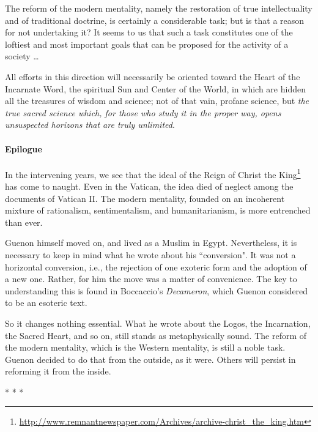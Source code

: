 \begin{quotex}
The reform of the modern mentality, namely the restoration of true intellectuality and of traditional doctrine, is certainly a considerable task; but is that a reason for not undertaking it? It seems to us that such a task constitutes one of the loftiest and most important goals that can be proposed for the activity of a society …

All efforts in this direction will necessarily be oriented toward the Heart of the Incarnate Word, the spiritual Sun and Center of the World, in which are hidden all the treasures of wisdom and science; not of that vain, profane science, but \emph{the true sacred science which, for those who study it in the proper way, opens unsuspected horizons that are truly unlimited}. 

\end{quotex}
\paragraph{Epilogue}
In the intervening years, we see that the ideal of the Reign of Christ the King\footnote{\url{http://www.remnantnewspaper.com/Archives/archive-christ_the_king.htm}} has come to naught. Even in the Vatican, the idea died of neglect among the documents of Vatican II. The modern mentality, founded on an incoherent mixture of rationalism, sentimentalism, and humanitarianism, is more entrenched than ever.

Guenon himself moved on, and lived as a Muslim in Egypt. Nevertheless, it is necessary to keep in mind what he wrote about his ``conversion". It was not a horizontal conversion, i.e., the rejection of one exoteric form and the adoption of a new one. Rather, for him the move was a matter of convenience. The key to understanding this is found in Boccaccio's \emph{Decameron}, which Guenon considered to be an esoteric text.

So it changes nothing essential. What he wrote about the Logos, the Incarnation, the Sacred Heart, and so on, still stands as metaphysically sound. The reform of the modern mentality, which is the Western mentality, is still a noble task. Guenon decided to do that from the outside, as it were. Others will persist in reforming it from the inside.




\begin{center}* * *\end{center}

